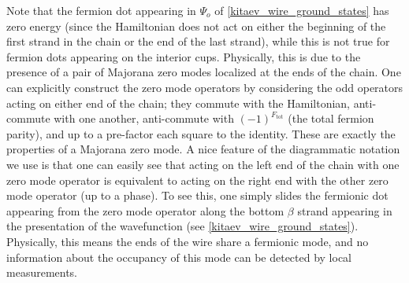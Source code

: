 
Note that the fermion dot appearing in $\Psi_o$ of \eqref{kitaev_wire_ground_states} has zero energy (since the Hamiltonian does not act on either the beginning of the first strand in the chain or the end of the last strand), while this is not true for fermion dots 
appearing on the interior cups. 
Physically, this is due to the presence of a pair of Majorana zero modes localized at the ends of the chain. 
One can explicitly construct the zero mode operators by considering the odd operators acting on either end of the chain; 
they commute with the Hamiltonian, anti-commute with one another, anti-commute with $(-1)^{F_\text{tot}}$ (the total fermion parity), and up to a pre-factor each square to the identity.
These are exactly the properties of a Majorana zero mode. 
A nice feature of the diagrammatic notation we use is that one can easily see that acting on the left end of the chain with one zero mode operator is equivalent to acting on the right end with the other zero mode operator (up to a phase).
To see this, one simply slides the fermionic dot appearing from the zero mode operator along the bottom $\beta$ strand appearing in the presentation of the wavefunction (see \eqref{kitaev_wire_ground_states}).
Physically, this means the ends of the wire share a fermionic mode, 
and no information about the occupancy of this mode can be detected by local measurements.




